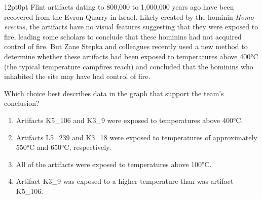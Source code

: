 \documentclass[11pt, twocolumn]{article}
\newcounter{questionnum}
\begin{document}
\vspace{6pt}\noindent
\begin{minipage}{\columnwidth}\raggedright
\noindent{}\par\vspace{8pt}
\begin{adjustwidth}{12pt}{0pt}
Flint artifacts dating to 800,000 to 1,000,000 years ago have been recovered from the Evron Quarry in Israel. Likely created by the hominin \textit{Homo erectus}, the artifacts have no visual features suggesting that they were exposed to fire, leading some scholars to conclude that these hominins had not acquired control of fire. But Zane Stepka and colleagues recently used a new method to determine whether these artifacts had been exposed to temperatures above 400°C (the typical temperature campfires reach) and concluded that the hominins who inhabited the site may have had control of fire.
\vspace{6pt}

Which choice best describes data in the graph that support the team's conclusion?
\begin{enumerate}[label=\Alph*),leftmargin=18pt,topsep=3pt,itemsep=2pt]
  \item Artifacts K5\_106 and K3\_9 were exposed to temperatures above 400°C.
  \item Artifacts L5\_239 and K3\_18 were exposed to temperatures of approximately 550°C and 650°C, respectively.
  \item All of the artifacts were exposed to temperatures above 100°C.
  \item Artifact K3\_9 was exposed to a higher temperature than was artifact K5\_106.
\end{enumerate}
\end{adjustwidth}
\end{minipage}\par
\end{document}
